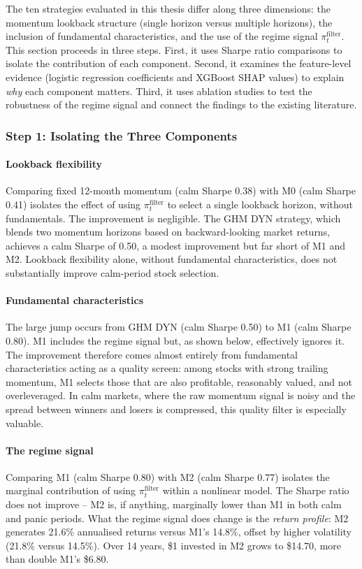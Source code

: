 The ten strategies evaluated in this thesis differ along three dimensions: the momentum lookback structure (single horizon versus multiple horizons), the inclusion of fundamental characteristics, and the use of the regime signal $\pi_t^{\text{filter}}$. This section proceeds in three steps. First, it uses Sharpe ratio comparisons to isolate the contribution of each component. Second, it examines the feature-level evidence (logistic regression coefficients and XGBoost SHAP values) to explain \emph{why} each component matters. Third, it uses ablation studies to test the robustness of the regime signal and connect the findings to the existing literature.

\subsubsection{Step 1: Isolating the Three Components}

\paragraph{Lookback flexibility}
Comparing fixed 12-month momentum (calm Sharpe 0.38) with M0 (calm Sharpe 0.41) isolates the effect of using $\pi_t^{\text{filter}}$ to select a single lookback horizon, without fundamentals. The improvement is negligible. The GHM DYN strategy, which blends two momentum horizons based on backward-looking market returns, achieves a calm Sharpe of 0.50, a modest improvement but far short of M1 and M2. Lookback flexibility alone, without fundamental characteristics, does not substantially improve calm-period stock selection.

\paragraph{Fundamental characteristics}
The large jump occurs from GHM DYN (calm Sharpe 0.50) to M1 (calm Sharpe 0.80). M1 includes the regime signal but, as shown below, effectively ignores it. The improvement therefore comes almost entirely from fundamental characteristics acting as a quality screen: among stocks with strong trailing momentum, M1 selects those that are also profitable, reasonably valued, and not overleveraged. In calm markets, where the raw momentum signal is noisy and the spread between winners and losers is compressed, this quality filter is especially valuable.

\paragraph{The regime signal}
Comparing M1 (calm Sharpe 0.80) with M2 (calm Sharpe 0.77) isolates the marginal contribution of using $\pi_t^{\text{filter}}$ within a nonlinear model. The Sharpe ratio does not improve -- M2 is, if anything, marginally lower than M1 in both calm and panic periods. What the regime signal does change is the \emph{return profile}: M2 generates 21.6\% annualised returns versus M1's 14.8\%, offset by higher volatility (21.8\% versus 14.5\%). Over 14 years, \$1 invested in M2 grows to \$14.70, more than double M1's \$6.80.

